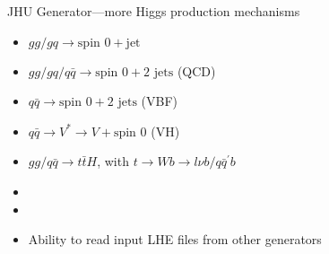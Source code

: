 \documentclass[usenames,dvipsnames,svgnames,table]{beamer}
\newcommand{\spin}[1]{\text{spin }#1}
\begin{document}
\begin{frame}{JHU Generator---more Higgs production mechanisms}
\begin{itemize}
\item $gg/gq\to\spin{0}+\text{jet}$
\item $gg/gq/q\bar{q}\to\spin{0}+2\text{ jets}$ (QCD)
\item $q\bar{q}\to\spin{0}+2\text{ jets}$ (VBF)
\item $q\bar{q}\to V^*\to V+\spin{0}$ (VH)
\item $gg/q\bar{q}\to t\bar{t}H$, with $t\to Wb \to l\nu b/q\bar{q}^\prime b$
\item
\item
\item Ability to read input LHE files from other generators
\end{itemize}
\end{frame}
\end{document}
